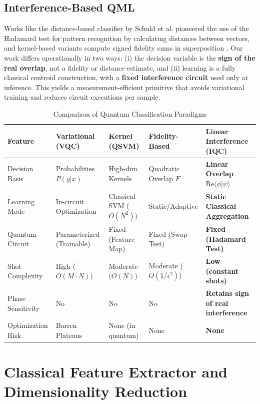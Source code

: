 \documentclass[conference]{IEEEtran}
\begin{document}
\subsection{Interference-Based QML}

Works like the distance-based classifier by Schuld et al. \cite{schuld2017distance,schuld2018book} pioneered the use of the Hadamard test for pattern recognition by calculating distances between vectors, and kernel-based variants compute signed fidelity sums in superposition \cite{blank2020kernel,blank2022compact}. Our work differs operationally in two ways: (i) the decision variable is the \textbf{sign of the real overlap}, not a fidelity or distance estimate, and (ii) learning is a fully classical centroid construction, with a \textbf{fixed interference circuit} used only at inference. This yields a measurement-efficient primitive that avoids variational training and reduces circuit executions per sample.

\begin{table}[t]
\centering
\caption{Comparison of Quantum Classification Paradigms}
\label{tab:comparison}
\begin{tabular}{@{}lllll@{}}
\toprule
Feature & Variational (VQC) & Kernel (QSVM) & Fidelity-Based & \textbf{Linear Interference (IQC)} \\ \midrule
Decision Basis & Probabilities $P(y|x)$ & High-dim Kernels & Quadratic Overlap $F$ & \textbf{Linear Overlap $\mathrm{Re}\langle \phi|\psi \rangle$} \\
Learning Mode & In-circuit Optimization & Classical SVM ($O(N^2)$) & Static/Adaptive & \textbf{Static Classical Aggregation} \\
Quantum Circuit & Parameterized (Trainable) & Fixed (Feature Map) & Fixed (Swap Test) & \textbf{Fixed (Hadamard Test)} \\
Shot Complexity & High ($O(M \cdot N)$) & Moderate ($O(N)$) & Moderate ($O(1/\epsilon^2)$) & \textbf{Low (constant shots)} \\
Phase Sensitivity & No & No & No & \textbf{Retains sign of real interference} \\
Optimization Risk & Barren Plateaus & None (in quantum) & None & \textbf{None} \\ \bottomrule
\end{tabular}
\end{table}

\section{Classical Feature Extractor and Dimensionality Reduction}
\end{document}
